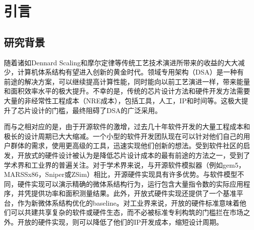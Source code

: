 \chapter{引言}\label{chap:introduction}


\section{研究背景}

随着诸如Dennard Scaling和摩尔定律等传统工艺技术演进所带来的收益的大大减少，计算机体系结构有望进入创新的黄金时代。领域专用架构（DSA）是一种有前途的解决方案，可以继续提高计算性能，同时能向以前工艺演进一样，带来能量和面积效率水平的极大提升。不幸的是，传统的芯片设计方法和硬件开发方法需要大量的非经常性工程成本（NRE成本），包括工具，人工，IP和时间等。这极大提升了芯片设计的门槛，最终阻碍了DSA的广泛采用。

而与之相对应的是，由于开源软件的激增，过去几十年软件开发的大量工程成本和极长的设计周期已大大缩减。一个小型的软件开发团队现在可以针对他们自己的用户群体的需求，使用更高级的工具，迅速实现他们创新的想法。受到软件社区的启发，开放式的硬件设计被认为是降低芯片设计成本的最有前途的方法之一，受到了学术界和工业界的普遍关注。对于学术界来说，与开源软件模拟器（例如gem5，MARSSx86，Sniper或ZSim）相比，开源硬件实现具有许多优势。与软件模型不同，硬件实现可以演示精确的微体系结构行为，运行包含大量指令数的实际应用程序，并凭提供功率和面积测量结果。此外，开放式硬件实现还提供了一个基准平台，作为新微体系结构优化的baseline。对工业界来说，开放的硬件标准意味着他们可以共建共享复杂的软件或硬件生态，而不必被标准专利构筑的门槛拦在市场之外。开放的硬件实现，则可以降低了他们的IP开发成本，缩短设计周期。

